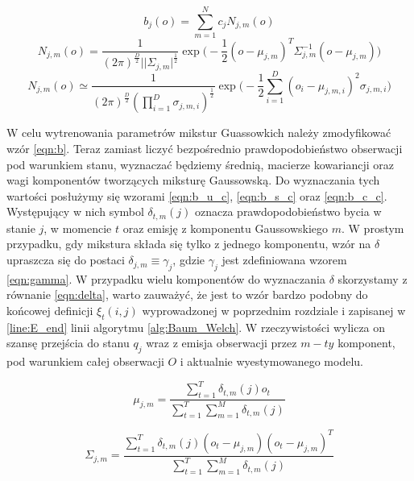 \documentclass[11pt]{article}
\begin{document}
	   \begin{equation}
		   	b_j(o) = \sum_{m=1}^N c_j N_{j,m}(o)
		   	\label{eqn:GMM}
	   \end{equation}
	   \begin{equation}
		   N_{j,m}(o)=\frac{1}{(2\pi)^{\frac{D}{2}}||\Sigma_{j,m}|^{\frac{1}{2}}}\exp\bigg( -\frac{1}{2}(o-\mu_{j,m})^T\Sigma_{j,m}^{-1}(o-\mu_{j,m}) \bigg)
		   \label{eqn:normal_distribution}
	   \end{equation}	
	   \begin{equation}
		   N_{j,m}(o)\simeq\frac{1}{(2\pi)^{\frac{D}{2}}(\prod_{i=1}^D\sigma_{j,m,i})^{\frac{1}{2}}}\exp\bigg( -\frac{1}{2}\sum_{i=1}^D(o_i-\mu_{j,m,i})^2\sigma_{j,m,i} \bigg)
	   \label{eqn:normal_distribution_simple}
	   \end{equation}
	   
	   W celu wytrenowania parametrów mikstur Guassowkich należy zmodyfikować wzór \ref{eqn:b}. Teraz zamiast liczyć bezpośrednio prawdopodobieństwo obserwacji pod warunkiem stanu, wyznaczać będziemy średnią, macierze kowariancji oraz wagi komponentów tworzących miksturę Gaussowską. Do wyznaczania tych wartości posłużymy się wzorami \ref{eqn:b_u_c}, \ref{eqn:b_s_c} oraz \ref{eqn:b_c_c}. Występujący w nich symbol $\delta_{t,m}(j)$ oznacza prawdopodobieństwo bycia w stanie $j$, w momencie $t$ oraz emisję z komponentu Gaussowskiego $m$. W prostym przypadku, gdy mikstura składa się tylko z jednego komponentu, wzór na $\delta$ upraszcza się do postaci $\delta_{j,m} \equiv \gamma_j$, gdzie $\gamma_j$ jest zdefiniowana wzorem \ref{eqn:gamma}. W przypadku wielu komponentów do wyznaczania $\delta$ skorzystamy z równanie \ref{eqn:delta}, warto zauważyć, że jest to wzór bardzo podobny do końcowej definicji $\xi _t(i,j)$ wyprowadzonej w poprzednim rozdziale i zapisanej w \ref{line:E_end} linii algorytmu \ref{alg:Baum_Welch}. W rzeczywistości wylicza on szansę przejścia do stanu $q_j$ wraz z emisja obserwacji przez $m-ty$ komponent, pod warunkiem całej obserwacji $O$ i aktualnie wyestymowanego modelu.
	   
	   \begin{equation}
	   \mu_{j,m}=\frac{\sum_{t=1}^T\delta_{t,m}(j)o_t}{\sum_{t=1}^T\sum_{m=1}^M\delta_{t,m}(j)}
	   \label{eqn:b_u_c}
	   \end{equation}
	   
	   \begin{equation}
	   \Sigma_{j,m}=\frac{\sum_{t=1}^T\delta_{t,m}(j)(o_t-\mu_{j,m})(o_t-\mu_{j,m})^T}{\sum_{t=1}^T\sum_{m=1}^M\delta_{t,m}(j)}
	   \label{eqn:b_s_c}
	   \end{equation}
	   
\end{document}
